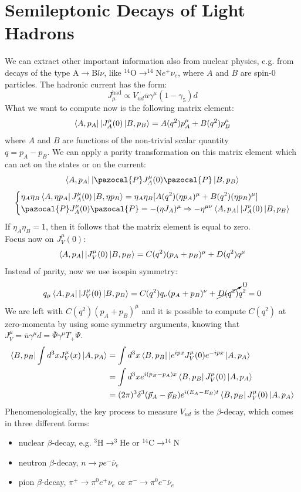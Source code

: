 \documentclass[../main.tex]{subfiles}
\begin{document}
\section{Semileptonic Decays of Light Hadrons}
We can extract other important information also from nuclear physics, e.g. from decays of the type A$\to$B$l\nu$, like $^{14}$O$\to^{14}$N$e^+\nu_e$, where $A$ and $B$ are spin-0 particles. The hadronic current has the form:
\[
J_\mu^{\text{had}}\propto V_{ud}\overline{u}\gamma^\mu(1-\gamma_5)d
\]
What we want to compute now is the following matrix element:
\[
\bra{A,p_A}|J_A^\mu(0)\ket{B,p_B}=A(q^2)p_A^\mu+B(q^2)p_B^\mu
\]
where $A$ and $B$ are functions of the non-trivial scalar quantity\\
$q=p_A-p_B$. We can apply a parity transformation on this matrix element which can act on the states or on the current:
\[
\bra{A,p_A}|\pazocal{P}J_A^\mu(0)\pazocal{P}\ket{B,p_B}
\]
\[
\left\{
\begin{aligned}
&\eta_A\eta_B\bra{A,\eta p_A}J_A^\mu(0)\ket{B,\eta p_B}=\eta_A\eta_B[A(q^2)(\eta p_A)^\mu+B(q^2)(\eta p_B)^\mu]\\
&\pazocal{P}J_A^\mu(0)\pazocal{P}=-(\eta J_A)^\mu\Rightarrow-\eta^{\mu\nu}\bra{A,p_A}|J_A^\nu(0)\ket{B,p_B}
\end{aligned}
\right.
\]
If $\eta_A\eta_B=1$, then it follows that the matrix element is equal to zero.\\
Focus now on $J_V^\mu(0)$:
\[
\bra{A,p_A}|J_V^\mu(0)\ket{B,p_B}=C(q^2)(p_A+p_B)^\mu+D(q^2)q^\mu
\]
Instead of parity, now we use isospin symmetry:
\[
q_\mu\bra{A,p_A}|J_V^\mu(0)\ket{B,p_B}=C(q^2)q_\nu(p_A+p_B)^\nu+\cancelto{0}{D(q^2)}q^2=0
\]
We are left with $C(q^2)(p_A+p_B)^\mu$ and it is possible to compute $C(q^2)$ at zero-momenta by using some symmetry arguments, knowing that $J_V^\mu=\overline{u}\gamma^\mu d=\overline{\Psi}\gamma^\mu T_+\Psi$.
\begin{align*}
\bra{B,p_B}\int d^3xJ_V^\mu(x)\ket{A,p_A}&=\int d^3x\bra{B,p_B}|e^{ipx}J_V^\mu(0)e^{-ipx}\ket{A,p_A}\\
&=\int d^3xe^{i(p_B-p_A)x}\bra{B,p_B}J_V^\mu(0)\ket{A,p_A}\\
&=(2\pi)^3\delta^3(\Vec{p}_A-\Vec{p}_B)e^{i(E_A-E_B)t}\bra{B,p_B}J_V^\mu(0)\ket{A,p_A}
\end{align*}
Phenomenologically, the key process to measure $V_{ud}$ is the $\beta$-decay, which comes in three different forms:
\begin{itemize}
    \item nuclear $\beta$-decay, e.g. $^3$H$\to^3$He or $^{14}$C$\to^{14}$N
    \item neutron $\beta$-decay, $n\to pe^-\overline{\nu}_e$
    \item pion $\beta$-decay, $\pi^+\to\pi^0e^+\nu_e$ or $\pi^-\to\pi^0e^-\overline{\nu}_e$
\end{itemize}
\end{document}
